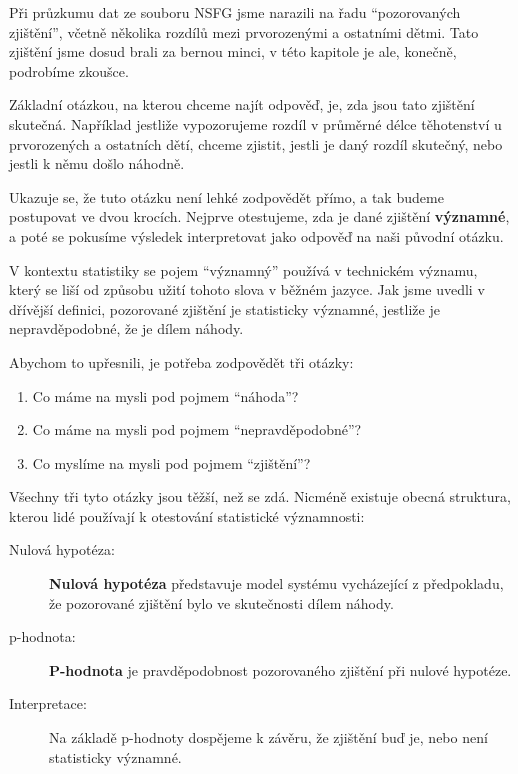 \documentclass[12pt]{book}
\begin{document}
Při průzkumu dat ze souboru NSFG jsme narazili na řadu ``pozorovaných zjištění'',
včetně několika rozdílů mezi prvorozenými a ostatními dětmi. Tato zjištění jsme dosud brali za bernou minci,
v této kapitole je ale, konečně, podrobíme zkoušce.

Základní otázkou, na kterou chceme najít odpověď, je, zda jsou tato zjištění skutečná. Například jestliže vypozorujeme
rozdíl v průměrné délce těhotenství u prvorozených a ostatních dětí, chceme zjistit, jestli je daný rozdíl skutečný, nebo jestli k němu došlo náhodně.

Ukazuje se, že tuto otázku není lehké zodpovědět přímo, a tak budeme postupovat
ve dvou krocích. Nejprve otestujeme, zda je dané zjištění {\bf
  významné}, a poté se pokusíme výsledek interpretovat jako odpověď na naši původní otázku.

V kontextu statistiky se pojem ``významný'' používá v technickém významu, který se liší od způsobu užití tohoto slova v běžném jazyce.
Jak jsme uvedli v dřívější definici, pozorované zjištění je statisticky významné, jestliže je nepravděpodobné, že je dílem náhody.

Abychom to upřesnili, je potřeba zodpovědět tři otázky:

\begin{enumerate}

\item Co máme na mysli pod pojmem ``náhoda''?

\item Co máme na mysli pod pojmem ``nepravděpodobné''?

\item Co myslíme na mysli pod pojmem ``zjištění''?

\end{enumerate}

Všechny tři tyto otázky jsou těžší, než se zdá. Nicméně existuje obecná struktura, kterou lidé používají k otestování statistické významnosti:

\begin{description}

\item[Nulová hypotéza:] {\bf Nulová hypotéza} představuje model systému vycházející z předpokladu, že pozorované zjištění bylo ve skutečnosti dílem náhody.

\item[p-hodnota:] {\bf P-hodnota} je pravděpodobnost pozorovaného zjištění při nulové hypotéze.

\item[Interpretace:] Na základě p-hodnoty dospějeme k závěru, že zjištění buď je, nebo není statisticky významné.
\end{description}
\end{document}

